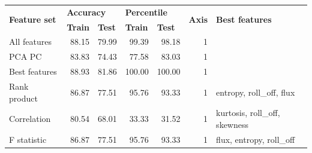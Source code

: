 \begin{table}[h]
\begin{adjustbox}{width=\textwidth}
\begin{tabular}{|l|rr|rr|r|l|}
\hline
\multirow{2}{*}{\textbf{Feature set}} & \multicolumn{2}{l|}{\textbf{Accuracy}}                                   & \multicolumn{2}{l|}{\textbf{Percentile}}                                 & \multicolumn{1}{l|}{\multirow{2}{*}{\textbf{Axis}}} & \multirow{2}{*}{\textbf{Best features}} \\ \cline{2-5}
                                      & \multicolumn{1}{l|}{\textbf{Train}} & \multicolumn{1}{l|}{\textbf{Test}} & \multicolumn{1}{l|}{\textbf{Train}} & \multicolumn{1}{l|}{\textbf{Test}} & \multicolumn{1}{l|}{}                               &                                         \\ \hline
All features                          & \multicolumn{1}{r|}{88.15}          & 79.99                              & \multicolumn{1}{r|}{99.39}          & 98.18                              & 1                                                   &                                         \\ \hline
PCA PC                                & \multicolumn{1}{r|}{83.83}          & 74.43                              & \multicolumn{1}{r|}{77.58}          & 83.03                              & 1                                                   &                                         \\ \hline
Best features                         & \multicolumn{1}{r|}{88.93}          & 81.86                              & \multicolumn{1}{r|}{100.00}         & 100.00                             & 1                                                   &                                         \\ \hline
Rank product                          & \multicolumn{1}{r|}{86.87}          & 77.51                              & \multicolumn{1}{r|}{95.76}          & 93.33                              & 1                                                   & entropy, roll\_off, flux                \\ \hline
Correlation                           & \multicolumn{1}{r|}{80.54}          & 68.01                              & \multicolumn{1}{r|}{33.33}          & 31.52                              & 1                                                   & kurtosis, roll\_off, skewness           \\ \hline
F statistic                           & \multicolumn{1}{r|}{86.87}          & 77.51                              & \multicolumn{1}{r|}{95.76}          & 93.33                              & 1                                                   & flux, entropy, roll\_off                \\ \hline

\end{tabular}
\end{adjustbox}
\end{table}
